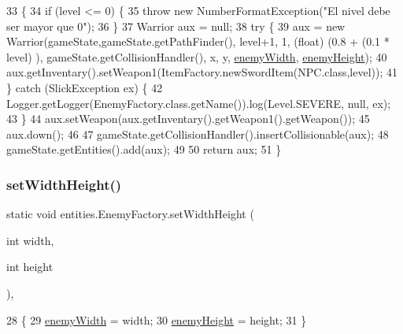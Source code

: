 \begin{DoxyCode}
33                                                                                                            
           \{
34         \textcolor{keywordflow}{if} (level <= 0) \{
35             \textcolor{keywordflow}{throw} \textcolor{keyword}{new} NumberFormatException(\textcolor{stringliteral}{"El nivel debe ser mayor que 0"});
36         \}
37         Warrior aux = null;
38         \textcolor{keywordflow}{try} \{
39             aux = \textcolor{keyword}{new} Warrior(gameState,gameState.getPathFinder(), level+1, 1, (float) (0.8 + (0.1 * level)
      ), gameState.getCollisionHandler(), x, y, \mbox{\hyperlink{classentities_1_1_enemy_factory_a3396d252fc506310c58e3a32494bbe36}{enemyWidth}}, \mbox{\hyperlink{classentities_1_1_enemy_factory_aa4632fbf138ccc9cc222e7437ccd8284}{enemyHeight}});
40             aux.getInventary().setWeapon1(ItemFactory.newSwordItem(NPC.class,level));
41         \} \textcolor{keywordflow}{catch} (SlickException ex) \{
42             Logger.getLogger(EnemyFactory.class.getName()).log(Level.SEVERE, null, ex);
43         \}
44         aux.setWeapon(aux.getInventary().getWeapon1().getWeapon());
45         aux.down();
46 
47         gameState.getCollisionHandler().insertCollisionable(aux);
48         gameState.getEntities().add(aux);
49 
50         \textcolor{keywordflow}{return} aux;
51     \}
\end{DoxyCode}
\mbox{\label{classentities_1_1_enemy_factory_ac365b8af00c2c3ee17d5fc4b4f0493b5}} 
\subsubsection{\texorpdfstring{set\+Width\+Height()}{setWidthHeight()}}
{\footnotesize\ttfamily static void entities.\+Enemy\+Factory.\+set\+Width\+Height (\begin{DoxyParamCaption}\item[{int}]{width,  }\item[{int}]{height }\end{DoxyParamCaption})\hspace{0.3cm}{\ttfamily [inline]}, {\ttfamily [static]}}


\begin{DoxyCode}
28                                                              \{
29         \mbox{\hyperlink{classentities_1_1_enemy_factory_a3396d252fc506310c58e3a32494bbe36}{enemyWidth}} = width;
30         \mbox{\hyperlink{classentities_1_1_enemy_factory_aa4632fbf138ccc9cc222e7437ccd8284}{enemyHeight}} = height;
31     \}
\end{DoxyCode}


